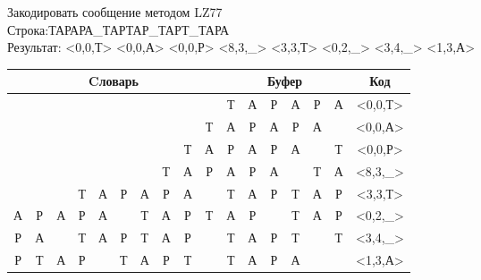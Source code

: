 \documentclass[a4paper, 12pt]{article}
\begin{document}
Закодировать сообщение методом LZ77\\
Строка:ТАРАРА\_ТАРТАР\_ТАРТ\_ТАРА\\
Результат: <0,0,Т> <0,0,А> <0,0,Р> <8,3,\_> <3,3,Т> <0,2,\_> <3,4,\_> <1,3,А>\\
\begin{table}[h!]
\centering
\begin{tabular}{|c|c|c|c|c|c|c|c|c|c|c|c|c|c|c|c|c|} 
\hline
\multicolumn{10}{|c|}{Cловарь} & \multicolumn{6}{c|}{Буфер} & Код  \\ \hline
  &   &   &   &   &   &   &   &   &   & \cellcolor[HTML]{8CE4F6} Т & А & Р & А & Р & А & <0,0,Т>
\\ \hline
  &   &   &   &   &   &   &   &   & Т & \cellcolor[HTML]{8CE4F6} А & Р & А & Р & А &   & <0,0,А>
\\ \hline
  &   &   &   &   &   &   &   & Т & А & \cellcolor[HTML]{8CE4F6} Р & А & Р & А &   & Т & <0,0,Р>
\\ \hline
  &   &   &   &   &   &   & Т & \cellcolor[HTML]{FFFF00} А & \cellcolor[HTML]{FFFF00} Р & \cellcolor[HTML]{FFFF00} А & \cellcolor[HTML]{FFFF00} Р & \cellcolor[HTML]{FFFF00} А & \cellcolor[HTML]{8CE4F6}   & Т & А & <8,3,\_>
\\ \hline
  &   &   & \cellcolor[HTML]{FFFF00} Т & \cellcolor[HTML]{FFFF00} А & \cellcolor[HTML]{FFFF00} Р & А & Р & А &   & \cellcolor[HTML]{FFFF00} Т & \cellcolor[HTML]{FFFF00} А & \cellcolor[HTML]{FFFF00} Р & \cellcolor[HTML]{8CE4F6} Т & А & Р & <3,3,Т>
\\ \hline
\cellcolor[HTML]{FFFF00} А & \cellcolor[HTML]{FFFF00} Р & А & Р & А &   & Т & А & Р & Т & \cellcolor[HTML]{FFFF00} А & \cellcolor[HTML]{FFFF00} Р & \cellcolor[HTML]{8CE4F6}   & Т & А & Р & <0,2,\_>
\\ \hline
Р & А &   & \cellcolor[HTML]{FFFF00} Т & \cellcolor[HTML]{FFFF00} А & \cellcolor[HTML]{FFFF00} Р & \cellcolor[HTML]{FFFF00} Т & А & Р &   & \cellcolor[HTML]{FFFF00} Т & \cellcolor[HTML]{FFFF00} А & \cellcolor[HTML]{FFFF00} Р & \cellcolor[HTML]{FFFF00} Т & \cellcolor[HTML]{8CE4F6}   & Т & <3,4,\_>
\\ \hline
Р & \cellcolor[HTML]{FFFF00} Т & \cellcolor[HTML]{FFFF00} А & \cellcolor[HTML]{FFFF00} Р &   & Т & А & Р & Т &   & \cellcolor[HTML]{FFFF00} Т & \cellcolor[HTML]{FFFF00} А & \cellcolor[HTML]{FFFF00} Р & \cellcolor[HTML]{8CE4F6} А &   &   & <1,3,А>
\\ \hline
\end{tabular}
\end{table}
\end{document}
